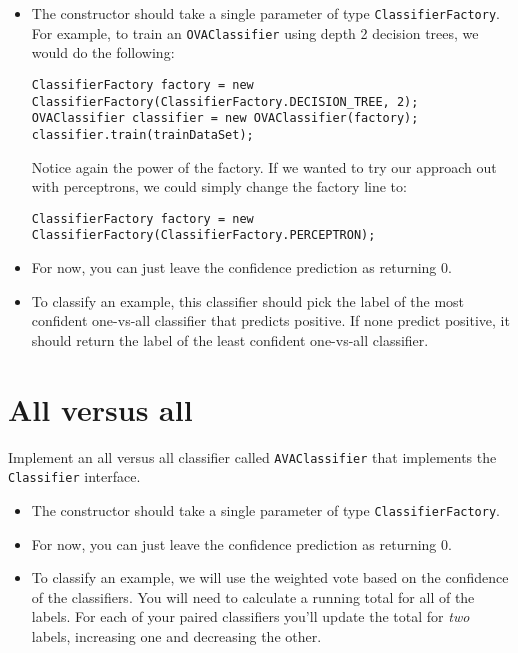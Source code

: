 \documentclass[11pt]{article}
\begin{document}
\begin{itemize}

\item The constructor should take a single parameter of type \texttt{ClassifierFactory}.  For example, to train an \texttt{OVAClassifier} using depth 2 decision trees, we would do the following:

\begin{verbatim}
ClassifierFactory factory = new ClassifierFactory(ClassifierFactory.DECISION_TREE, 2);
OVAClassifier classifier = new OVAClassifier(factory);
classifier.train(trainDataSet);
\end{verbatim}

Notice again the power of the factory.  If we wanted to try our approach out with perceptrons, we could simply change the factory line to:

\begin{verbatim}
ClassifierFactory factory = new ClassifierFactory(ClassifierFactory.PERCEPTRON);
\end{verbatim}

\item For now, you can just leave the confidence prediction as returning 0.

\item To classify an example, this classifier should pick the label of the most confident one-vs-all classifier that predicts positive.  If none predict positive, it should return the label of the least confident one-vs-all classifier.

\end{itemize}

\section{All versus all}

Implement an all versus all classifier called \texttt{AVAClassifier} that implements the \texttt{Classifier} interface.

\begin{itemize}

\item The constructor should take a single parameter of type \texttt{ClassifierFactory}.

\item For now, you can just leave the confidence prediction as returning 0.

\item To classify an example, we will use the weighted vote based on the confidence of the classifiers.  You will need to calculate a running total for all of the labels.  For each of your paired classifiers you'll update the total for \emph{two} labels, increasing one and decreasing the other.

\end{itemize}
\end{document}
